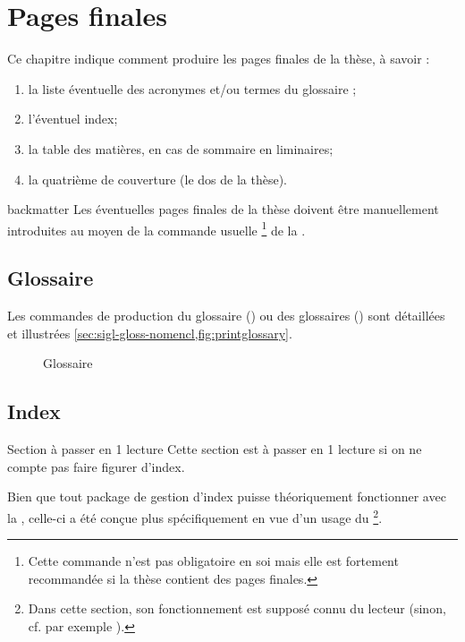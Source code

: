 \chapter{Pages finales}
\label{cha:pages-finales}

Ce chapitre indique comment produire les pages finales de la thèse,
à savoir :
\begin{enumerate}
\item la liste éventuelle des acronymes et/ou
  termes du glossaire ;
\item l'éventuel index;
\item la table des matières, en cas de sommaire en \glspl{liminaire};
\item la quatrième de couverture (le dos de la thèse).
\end{enumerate}

\begin{docCommand}{backmatter}{}
  Les éventuelles pages finales de la thèse doivent être manuellement
  introduites au moyen de la commande usuelle
  \footnote{Cette commande n'est pas obligatoire en
    soi mais elle est fortement recommandée si la thèse contient des pages
    finales.} de la \nofrontmatter.
\end{docCommand}

\section{Glossaire}

Les commandes de production du glossaire () ou
des glossaires () sont détaillées et illustrées
\vref{sec:sigl-gloss-nomencl,fig:printglossary}.

\begin{figure}[htbp]
  \centering
  \caption{Glossaire}
  \label{fig:printglossary}
\end{figure}

\section{Index}

\begin{dbremark*}{Section à passer en 1\iere{} lecture}
  Cette section est à passer en 1\iere{} lecture si on ne compte pas faire
  figurer d'index.
\end{dbremark*}

Bien que tout package de gestion d'index puisse théoriquement fonctionner avec
la \yatcl, celle-ci a été conçue plus spécifiquement en vue d'un usage du
\footnote{Dans cette section, son fonctionnement est supposé
  connu du lecteur (sinon, cf. par exemple \cite{en-ligne7}).}.

